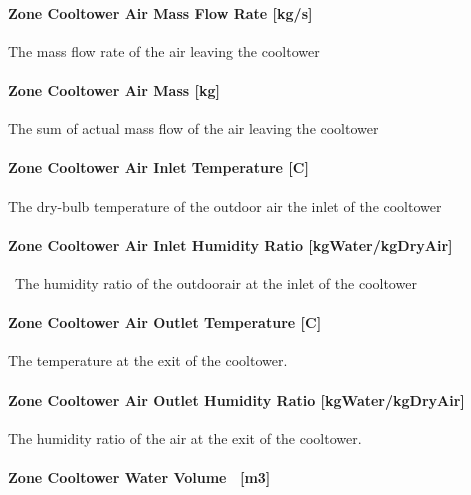 \paragraph{Zone Cooltower Air Mass Flow Rate {[}kg/s{]}}\label{zone-cooltower-air-mass-flow-rate-kgs}

The mass flow rate of the air leaving the cooltower

\paragraph{Zone Cooltower Air Mass {[}kg{]}}\label{zone-cooltower-air-mass-kg}

The sum of actual mass flow of the air leaving the cooltower

\paragraph{Zone Cooltower Air Inlet Temperature {[}C{]}}\label{zone-cooltower-air-inlet-temperature-c}

The dry-bulb temperature of the outdoor air the inlet of the cooltower

\paragraph{Zone Cooltower Air Inlet Humidity Ratio {[}kgWater/kgDryAir{]}}\label{zone-cooltower-air-inlet-humidity-ratio-kgwaterkgdryair}

~The humidity ratio of the outdoorair at the inlet of the cooltower

\paragraph{Zone Cooltower Air Outlet Temperature {[}C{]}}\label{zone-cooltower-air-outlet-temperature-c}

The temperature at the exit of the cooltower.

\paragraph{Zone Cooltower Air Outlet Humidity Ratio {[}kgWater/kgDryAir{]}}\label{zone-cooltower-air-outlet-humidity-ratio-kgwaterkgdryair}

The humidity ratio of the air at the exit of the cooltower.

\paragraph{Zone Cooltower Water Volume ~{[}m3{]}}\label{zone-cooltower-water-volume-m3}


